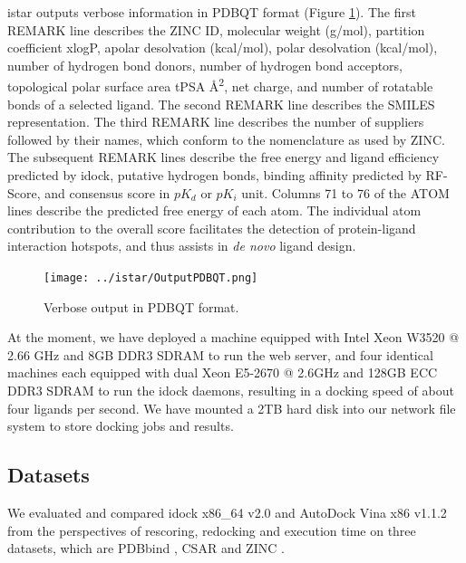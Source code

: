 istar outputs verbose information in PDBQT format (Figure \ref{istar:OutputPDBQT}). The first REMARK line describes the ZINC ID, molecular weight (g/mol), partition coefficient xlogP, apolar desolvation (kcal/mol), polar desolvation (kcal/mol), number of hydrogen bond donors, number of hydrogen bond acceptors, topological polar surface area tPSA \AA\textsuperscript{2}, net charge, and number of rotatable bonds of a selected ligand. The second REMARK line describes the SMILES representation. The third REMARK line describes the number of suppliers followed by their names, which conform to the nomenclature as used by ZINC. The subsequent REMARK lines describe the free energy and ligand efficiency predicted by idock, putative hydrogen bonds, binding affinity predicted by RF-Score, and consensus score in $pK_d$ or $pK_i$ unit. Columns 71 to 76 of the ATOM lines describe the predicted free energy of each atom. The individual atom contribution to the overall score facilitates the detection of protein-ligand interaction hotspots, and thus assists in \textit{de novo} ligand design.

\begin{figure}
\centering
\texttt{[image: ../istar/OutputPDBQT.png]}
\caption{Verbose output in PDBQT format.}
\label{istar:OutputPDBQT}
\end{figure}

At the moment, we have deployed a machine equipped with Intel Xeon W3520 @ 2.66 GHz and 8GB DDR3 SDRAM to run the web server, and four identical machines each equipped with dual Xeon E5-2670 @ 2.6GHz and 128GB ECC DDR3 SDRAM to run the idock daemons, resulting in a docking speed of about four ligands per second. We have mounted a 2TB hard disk into our network file system to store docking jobs and results.

\subsection{Datasets}

We evaluated and compared idock x86\_64 v2.0 and AutoDock Vina x86 v1.1.2 from the perspectives of rescoring, redocking and execution time on three datasets, which are PDBbind \citep{529,530}, CSAR \citep{857,960} and ZINC \citep{532,1178}.

